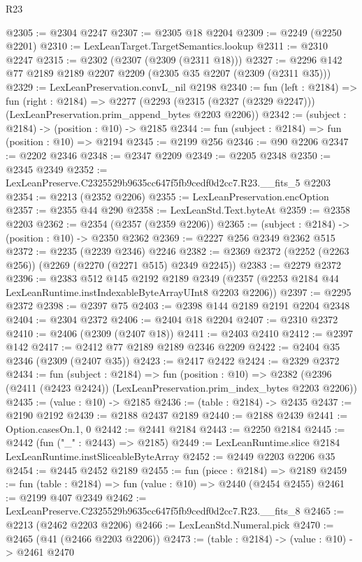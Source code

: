 \begin{lexlean}{R23}
\begin{coremodule}
@2305 := @2304 @2247
@2307 := @2305 @18 @2204
@2309 := @2249 (@2250 @2201)
@2310 := LexLeanTarget.TargetSemantics.lookup
@2311 := @2310 @2247
@2315 := @2302 (@2307 (@2309 (@2311 @18)))
@2327 := @2296 @142 @77 @2189 @2189 @2207 @2209 (@2305 @35 @2207 (@2309 (@2311 @35)))
@2329 := LexLeanPreservation.convL_nil @2198
@2340 := fun (left : @2184) =>
  fun (right : @2184) =>
  @2277 (@2293 (@2315 (@2327 (@2329 @2247))) (LexLeanPreservation.prim_append_bytes @2203 @2206))
@2342 := (subject : @2184) -> (position : @10) -> @2185
@2344 := fun (subject : @2184) => fun (position : @10) => @2194
@2345 := @2199 @256
@2346 := @90 @2206
@2347 := @2202 @2346
@2348 := @2347 @2209
@2349 := @2205 @2348
@2350 := @2345 @2349
@2352 := LexLeanPreserve.C2325529b9635cc647f5fb9cedf0d2cc7.R23.__fits_5 @2203
@2354 := @2213 (@2352 @2206)
@2355 := LexLeanPreservation.encOption
@2357 := @2355 @44 @290
@2358 := LexLeanStd.Text.byteAt
@2359 := @2358 @2203
@2362 := @2354 (@2357 (@2359 @2206))
@2365 := (subject : @2184) -> (position : @10) -> @2350 @2362
@2369 := @2227 @256 @2349 @2362 @515
@2372 := @2235 (@2239 @2346) @2246
@2382 := @2369 @2372 (@2252 (@2263 @256)) (@2269 (@2270 (@2271 @515) @2349 @2245))
@2383 := @2279 @2372
@2396 := @2383
    @512
    @145
    @2192
    @2189
    @2349
    (@2357 (@2253 @2184 @44 LexLeanRuntime.instIndexableByteArrayUInt8 @2203 @2206))
@2397 := @2295 @2372
@2398 := @2397 @75
@2403 := @2398 @144 @2189 @2191 @2204 @2348
@2404 := @2304 @2372
@2406 := @2404 @18 @2204
@2407 := @2310 @2372
@2410 := @2406 (@2309 (@2407 @18))
@2411 := @2403 @2410
@2412 := @2397 @142
@2417 := @2412 @77 @2189 @2189 @2346 @2209
@2422 := @2404 @35 @2346 (@2309 (@2407 @35))
@2423 := @2417 @2422
@2424 := @2329 @2372
@2434 := fun (subject : @2184) =>
  fun (position : @10) =>
  @2382 (@2396 (@2411 (@2423 @2424)) (LexLeanPreservation.prim_index_bytes @2203 @2206))
@2435 := (value : @10) -> @2185
@2436 := (table : @2184) -> @2435
@2437 := @2190 @2192
@2439 := @2188 @2437 @2189
@2440 := @2188 @2439
@2441 := Option.casesOn.{1, 0}
@2442 := @2441 @2184
@2443 := @2250 @2184
@2445 := @2442 (fun ("_" : @2443) => @2185)
@2449 := LexLeanRuntime.slice @2184 LexLeanRuntime.instSliceableByteArray
@2452 := @2449 @2203 @2206 @35
@2454 := @2445 @2452 @2189
@2455 := fun (piece : @2184) => @2189
@2459 := fun (table : @2184) => fun (value : @10) => @2440 (@2454 @2455)
@2461 := @2199 @407 @2349
@2462 := LexLeanPreserve.C2325529b9635cc647f5fb9cedf0d2cc7.R23.__fits_8
@2465 := @2213 (@2462 @2203 @2206)
@2466 := LexLeanStd.Numeral.pick
@2470 := @2465 (@41 (@2466 @2203 @2206))
@2473 := (table : @2184) -> (value : @10) -> @2461 @2470

\end{coremodule}
\end{lexlean}
